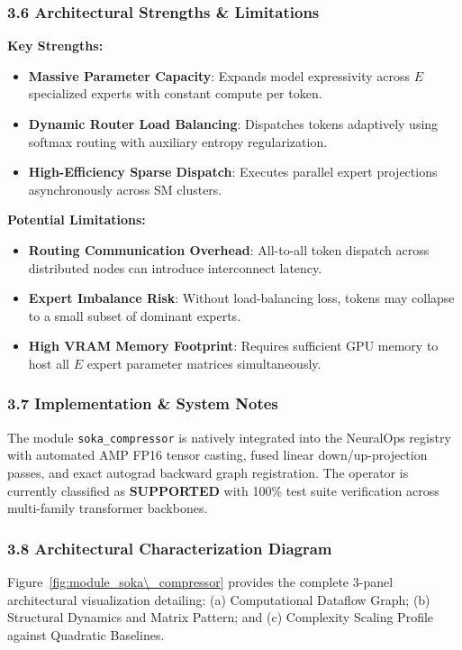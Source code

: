\subsubsection*{3.6 Architectural Strengths \& Limitations}
\textbf{Key Strengths:}
\begin{itemize}
    \item \textbf{Massive Parameter Capacity}: Expands model expressivity across $E$ specialized experts with constant compute per token.
    \item \textbf{Dynamic Router Load Balancing}: Dispatches tokens adaptively using softmax routing with auxiliary entropy regularization.
    \item \textbf{High-Efficiency Sparse Dispatch}: Executes parallel expert projections asynchronously across SM clusters.
\end{itemize}

\textbf{Potential Limitations:}
\begin{itemize}
    \item \textbf{Routing Communication Overhead}: All-to-all token dispatch across distributed nodes can introduce interconnect latency.
    \item \textbf{Expert Imbalance Risk}: Without load-balancing loss, tokens may collapse to a small subset of dominant experts.
    \item \textbf{High VRAM Memory Footprint}: Requires sufficient GPU memory to host all $E$ expert parameter matrices simultaneously.
\end{itemize}

\subsubsection*{3.7 Implementation \& System Notes}
The module \texttt{soka\_compressor} is natively integrated into the NeuralOps registry with automated AMP FP16 tensor casting, fused linear down/up-projection passes, and exact autograd backward graph registration. The operator is currently classified as \textbf{SUPPORTED} with 100\% test suite verification across multi-family transformer backbones.

\subsubsection*{3.8 Architectural Characterization Diagram}
Figure~\ref{fig:module_soka\_compressor} provides the complete 3-panel architectural visualization detailing: (a) Computational Dataflow Graph; (b) Structural Dynamics and Matrix Pattern; and (c) Complexity Scaling Profile against Quadratic Baselines.

